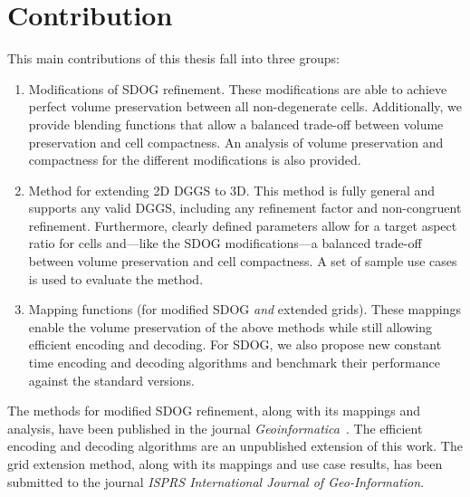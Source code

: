 \section{Contribution}
This main contributions of this thesis fall into three groups:

\begin{enumerate}
	\item Modifications of SDOG refinement.
	These modifications are able to achieve perfect volume preservation between all non-degenerate cells.
	Additionally, we provide blending functions that allow a balanced trade-off between volume preservation and cell compactness.
	An analysis of volume preservation and compactness for the different modifications is also provided.
	
	\item Method for extending 2D DGGS to 3D.
	This method is fully general and supports any valid DGGS, including any refinement factor and non-congruent refinement.
	Furthermore, clearly defined parameters allow for a target aspect ratio for cells and---like the SDOG modifications---a balanced trade-off between volume preservation and cell compactness.
	A set of sample use cases is used to evaluate the method.
	
	\item Mapping functions (for modified SDOG \textit{and} extended grids).
	These mappings enable the volume preservation of the above methods while still allowing efficient encoding and decoding.
	For SDOG, we also propose new constant time encoding and decoding algorithms and benchmark their performance against the standard versions.
\end{enumerate}

The methods for modified SDOG refinement, along with its mappings and analysis, have been published in the journal \textit{Geoinformatica}~\cite{ulmertoward2020}.
The efficient encoding and decoding algorithms are an unpublished extension of this work.
The grid extension method, along with its mappings and use case results, has been submitted to the journal \textit{ISPRS International Journal of Geo-Information}.


